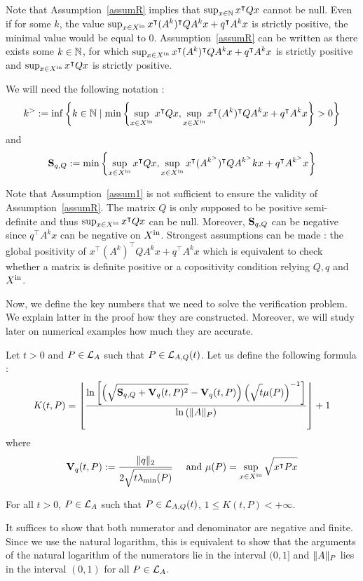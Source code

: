 \documentclass[10pt]{article}
\begin{document}
Note that Assumption~\ref{assumR} implies that $\sup_{x\in\mathbb{N}} x^\intercal Q x$ cannot be null. Even if for some $k$, the value
$\sup_{x\in X^\mathrm{in}} x^\intercal (A^k)^\intercal Q A^k x+q^\intercal A^k x$ is strictly positive, the minimal value would be equal to 0. 
Assumption~\ref{assumR} can be written as there exists  some $k\in\mathbb{N}$, for which $\sup_{x\in X^\mathrm{in}} x^\intercal (A^k)^\intercal Q A^k x+q^\intercal A^k x$ is strictly positive and $\sup_{x\in X^\mathrm{in}} x^\intercal Q x$ is strictly positive.

We will need the following notation :
\[
k^{>}:=\inf\left\{k\in\mathbb{N}\mid \min\left\{\sup_{x\in X^\mathrm{in}} x^\intercal Q x , \sup_{x\in X^\mathrm{in}} x^\intercal (A^k)^\intercal Q A^k x+q^\intercal A^k x\right\}>0\right\}
\]
and
\[
\mathbf{S}_{q,Q}:= \min\left\{\sup_{x\in X^\mathrm{in}} x^\intercal Q x , \sup_{x\in X^\mathrm{in}} x^\intercal (A^{k^{>}})^\intercal Q A^{k^{>}}k x+q^\intercal A^{k^{>}}x\right\}
\]

Note that Assumption~\ref{assum1} is not sufficient to ensure the validity of Assumption~\ref{assumR}. The matrix $Q$ is only supposed to be positive semi-definite and thus $\sup_{x\in X^\mathrm{in}} x^\intercal Q x$ can be null. Moreover, $\mathbf{S}_{q,Q}$ can be negative since $q^\intercal A^k x$ can be negative on $X^\mathrm{in}$. Strongest assumptions can be made : the global positivity of $x^\intercal (A^k)^\intercal  Q A^k x+q^\intercal A^k x$ which is equivalent to check whether a matrix is definite positive or a copositivity condition relying $Q,q$ and $X^\mathrm{in}$. 

Now, we define the key numbers that we need to solve the verification problem. We explain latter in the proof how they are constructed. Moreover, we will study later on numerical examples how much they are accurate.  


Let $t>0$ and $P\in\mathcal{L}_{A}$ such that $P\in \mathcal{L}_{A,Q}(t)$. Let us define the following formula :
\begin{equation}
\label{intgfond}
K(t,P)=\left\lfloor \dfrac{\ln\left[\left(\sqrt{\strut \mathbf{S}_{q,Q}+\mathbf{V}_{q}(t,P)^2}-\mathbf{V}_{q}(t,P)\right)\left(\sqrt{\strut t}\mu(P)\right)^{-1}\right]}{\ln\left(\| A\|_P\right)}\right\rfloor+1
\end{equation}
where 
\[
\mathbf{V}_{q}(t,P):=\dfrac{\| q\|_2 }{2\sqrt{\strut t\lambda_{\operatorname{min}}(P)}}\quad \text{ and } \mu(P)=\sup_{x\in X^\mathrm{in}} \sqrt{\strut x^\intercal P x}
\]


\begin{prop}
For all $t>0$, $P\in \mathcal{L}_{A}$ such that $P\in \mathcal{L}_{A,Q}(t)$, $1\leq K(t,P)< +\infty$.  
\end{prop}

It suffices to show that both numerator and denominator are negative and finite. Since we use the natural logarithm, this is equivalent to show that the arguments of the natural logarithm of the numerators lie in the interval $(0,1]$ and $\| A\|_P$ lies in the interval $(0,1)$ for all $P\in\mathcal{L}_{A}$. 
\end{document}
